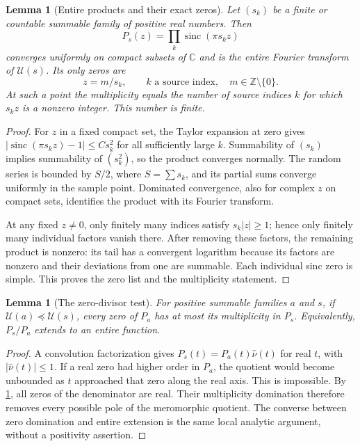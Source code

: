 \documentclass[11pt,letterpaper]{article}
\newtheorem{lemma}[theorem]{Lemma}
\theoremstyle{definition}
\theoremstyle{remark}
\newcommand{\C}{\mathbb C}
\newcommand{\Z}{\mathbb Z}
\newcommand{\Un}{\mathcal U}
\newcommand{\sinc}{\operatorname{sinc}}
\numberwithin{equation}{section}
\begin{document}
\begin{lemma}[Entire products and their exact zeros]\label{lem:zeros}
Let $(s_k)$ be a finite or countable summable family of positive real numbers. Then
\[
 P_s(z)=\prod_k\sinc(\pi s_kz)
\]
converges uniformly on compact subsets of $\C$ and is the entire Fourier transform of $\Un(s)$. Its only zeros are
\[
 z=m/s_k,\qquad k\text{ a source index},\quad m\in\Z\setminus\{0\}.
\]
At such a point the multiplicity equals the number of source indices $k$ for which $s_kz$ is a nonzero integer. This number is finite.
\end{lemma}
\begin{proof}
For $z$ in a fixed compact set, the Taylor expansion at zero gives
$|\sinc(\pi s_kz)-1|\le C s_k^2$ for all sufficiently large $k$. Summability of $(s_k)$ implies summability of $(s_k^2)$, so the product converges normally. The random series is bounded by $S/2$, where $S=\sum s_k$, and its partial sums converge uniformly in the sample point. Dominated convergence, also for complex $z$ on compact sets, identifies the product with its Fourier transform.

At any fixed $z\ne0$, only finitely many indices satisfy $s_k|z|\ge1$; hence only finitely many individual factors vanish there. After removing these factors, the remaining product is nonzero: its tail has a convergent logarithm because its factors are nonzero and their deviations from one are summable. Each individual sinc zero is simple. This proves the zero list and the multiplicity statement.
\end{proof}

\begin{lemma}[The zero-divisor test]\label{lem:zero-test}
For positive summable families $a$ and $s$, if $\Un(a)\preceq\Un(s)$, every zero of $P_a$ has at most its multiplicity in $P_s$. Equivalently, $P_s/P_a$ extends to an entire function.
\end{lemma}
\begin{proof}
A convolution factorization gives $P_s(t)=P_a(t)\widehat\nu(t)$ for real $t$, with $|\widehat\nu(t)|\le1$. If a real zero had higher order in $P_a$, the quotient would become unbounded as $t$ approached that zero along the real axis. This is impossible. By \cref{lem:zeros}, all zeros of the denominator are real. Their multiplicity domination therefore removes every possible pole of the meromorphic quotient. The converse between zero domination and entire extension is the same local analytic argument, without a positivity assertion.
\end{proof}
\end{document}
